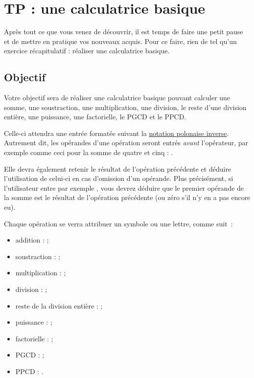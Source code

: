 \chapter{TP : une calculatrice basique}
\label{TP-:-une-calculatrice-basique}

Après tout ce que vous venez de découvrir, il est temps de faire une
petit pause et de mettre en pratique vos nouveaux acquis. Pour ce faire,
rien de tel qu'un exercice récapitulatif : réaliser une calculatrice
basique.

\section{Objectif}
\label{objectif}

Votre objectif sera de réaliser une calculatrice basique pouvant
calculer une somme, une soustraction, une multiplication, une division,
le reste d'une division entière, une puissance, une factorielle, le PGCD
et le PPCD.

Celle-ci attendra une entrée formatée suivant la
\href{http://fr.wikipedia.org/wiki/Notation_polonaise_inverse}{notation
polonaise inverse}. Autrement dit, les opérandes d'une opération seront
entrés \emph{avant} l'opérateur, par exemple comme ceci pour la somme de
quatre et cinq : .

Elle devra également retenir le résultat de l'opération précédente et
déduire l'utilisation de celui-ci en cas d'omission d'un opérande. Plus
précisément, si l'utilisateur entre par exemple , vous
devrez déduire que le premier opérande de la somme est le résultat de
l'opération précédente (ou zéro s'il n'y en a pas encore eu).

Chaque opération se verra attribuer un symbole ou une lettre, comme suit~:

\begin{itemize}
\item
  addition : \mybox{+} ;
\item
  soustraction : \mybox{-} ;
\item
  multiplication : \mybox{*} ;
\item
  division : \mybox{/} ;
\item
  reste de la division entière : \mybox{\%} ;
\item
  puissance : \mybox{\^{}} ;
\item
  factorielle : \mybox{!} ;
\item
  PGCD :  ;
\item
  PPCD : .
\end{itemize}

